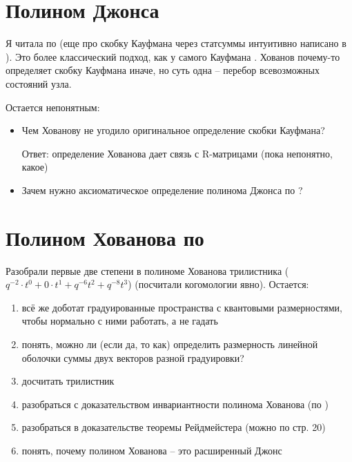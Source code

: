 \documentclass[a4paper,8pt]{extarticle}
\begin{document}
\section{Полином Джонса}

Я читала по \parencite{prasolov-sossinsky} 
(еще про скобку Кауфмана через статсуммы 
интуитивно написано в \parencite{sossinsky}). 
Это более классический подход, как у самого 
Кауфмана \parencite{kauffman}. Хованов 
\parencite{khovanov} почему-то определяет 
скобку Кауфмана иначе, но суть одна -- перебор всевозможных состояний узла. 

Остается непонятным:

\begin{itemize}
    \item Чем Хованову не угодило оригинальное определение скобки Кауфмана?

    Ответ: определение Хованова дает связь с R-матрицами (пока непонятно, какое)
    
    \item Зачем нужно аксиоматическое определение полинома Джонса по \parencite{prasolov-sossinsky}?
\end{itemize}

\section{Полином Хованова по \parencite{bar-natan}}
Разобрали первые две степени в полиноме Хованова трилистника ($q^{-2}\cdot t^0+0\cdot t^1 + q^{-6}t^2+q^{-8}t^3$) (посчитали когомологии явно). Остается:
\begin{enumerate}
    \item всё же доботат градуированные пространства с квантовыми размерностями, чтобы нормально с ними работать, а не гадать
    \item понять, можно ли (если да, то как) определить размерность линейной оболочки суммы двух векторов разной градуировки?
    \item досчитать трилистник
    \item разобраться с доказательством инвариантности полинома Хованова (по \parencite{bar-natan})
    \item разобраться в доказательстве теоремы Рейдмейстера (можно по \parencite{prasolov-sossinsky} стр. 20)
    \item понять, почему полином Хованова -- это расширенный Джонс
\end{enumerate}

\printbibliography
\end{document}
